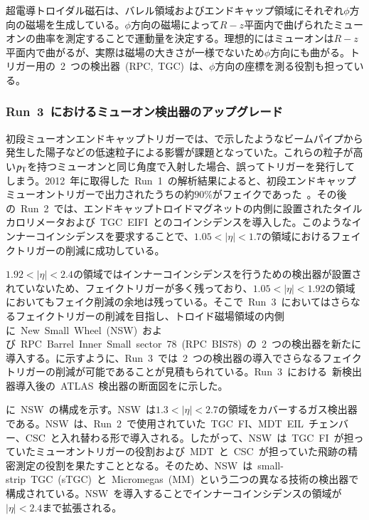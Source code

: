 超電導トロイダル磁石は、バレル領域およびエンドキャップ領域にそれぞれ$\phi$方向の磁場を生成している。$\phi$方向の磁場によって$R-z$平面内で曲げられたミューオンの曲率を測定することで運動量を決定する。理想的にはミューオンは$R-z$平面内で曲がるが、実際は磁場の大きさが一様でないため$\phi$方向にも曲がる。トリガー用の~2~つの検出器~(RPC,~TGC)~は、$\phi$方向の座標を測る役割も担っている。





\subsubsection{Run~3~におけるミューオン検出器のアップグレード}
初段ミューオンエンドキャップトリガーでは、で示したようなビームパイプから発生した陽子などの低速粒子による影響が課題となっていた。これらの粒子が高い$p_{\rm{T}}$を持つミューオンと同じ角度で入射した場合、誤ってトリガーを発行してしまう。2012~年に取得した~Run~1~の解析結果によると、初段エンドキャップミューオントリガーで出力されたうちの約$90\%$がフェイクであった~\cite{TR:05}。その後の~Run~2~では、エンドキャップトロイドマグネットの内側に設置されたタイルカロリメータおよび~TGC~EIFI~とのコインシデンスを導入した。このようなインナーコインシデンスを要求することで、$1.05<|\eta|<1.7$の領域におけるフェイクトリガーの削減に成功している。

$1.92<|\eta|<2.4$の領域ではインナーコインシデンスを行うための検出器が設置されていないため、フェイクトリガーが多く残っており、$1.05<|\eta|<1.92$の領域においてもフェイク削減の余地は残っている。そこで~Run~3~においてはさらなるフェイクトリガーの削減を目指し、トロイド磁場領域の内側に~New~Small~Wheel~(NSW)~および~RPC~Barrel~Inner~Small~sector~78~(RPC~BIS78)~の~2~つの検出器を新たに導入する。に示すように、Run~3~では~2~つの検出器の導入でさらなるフェイクトリガーの削減が可能であることが見積もられている。Run~3~における~新検出器導入後の~ATLAS~検出器の断面図をに示した。

に~NSW~の構成を示す。NSW~は$1.3<|\eta|<2.7$の領域をカバーするガス検出器である。NSW~は、Run~2~で使用されていた~TGC~FI、MDT~EIL~チェンバー、CSC~と入れ替わる形で導入される。したがって、NSW~は~TGC~FI~が担っていたミューオントリガーの役割および~MDT~と~CSC~が担っていた飛跡の精密測定の役割を果たすこととなる。そのため、NSW~は~small-strip~TGC~(sTGC)~と~Micromegas~(MM)~という二つの異なる技術の検出器で構成されている。NSW~を導入することでインナーコインシデンスの領域が$|\eta|<2.4$まで拡張される。

